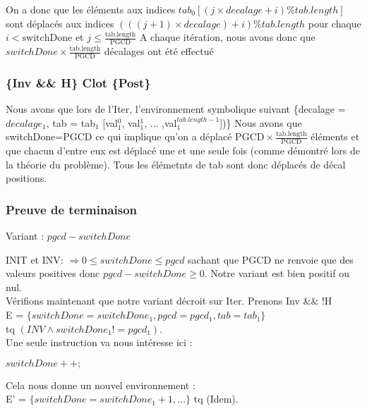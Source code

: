 On a donc que les éléments aux indices $tab_{0}[(j \times decalage + i) \% tab.length]$ sont déplacés aux indices $(((j+1)\times decalage)+i) \% tab.length$ pour chaque $i < \mathrm{switchDone}$ et $j \leq \frac{\mathrm{tab.length}}{\mathrm{PGCD}}$ 
A chaque itération, nous avons donc que $switchDone \times \frac {\mathrm{tab.length}}{\mathrm{PGCD}}$ décalages ont été effectué
\subsubsection*{\{Inv \&\& H\} Clot \{Post\}}
Nous avons que lors de l'Iter, l'environnement symbolique suivant \{decalage = $decalage_{1}$, tab = tab$_{1}$ [val$_{1}^{0}$, val$_{1}^{1}$, ... ,val$_{1}^{tab.length-1}$])\}
 Nous avons que switchDone=PGCD ce qui implique qu'on a déplacé
$\mathrm{PGCD}\times \frac{\mathrm{tab.length}}{\mathrm{PGCD}}$ éléments et
que chacun d'entre eux est déplacé une et une seule fois (comme démontré lors de la théorie du problème). Tous les élémetnts de tab sont donc déplacés de décal positions.

\subsubsection*{Preuve de terminaison}

Variant  : $pgcd - switchDone$

INIT et INV:  $\Rightarrow 0 \leq switchDone \leq pgcd$ sachant que PGCD ne renvoie que des valeurs positives donc $pgcd - switchDone \geq 0$. Notre variant est bien positif ou nul.\\ 

Vérifions maintenant que notre variant décroit sur Iter. Prenons Inv $\&\&$ !H \\

E = $\{ switchDone = switchDone_{1}, pgcd = pgcd_{1}, tab = tab_{1}\}$\\
tq $(INV \wedge switchDone_{1} != pgcd_{1})$.\\

Une seule instruction va nous intéresse ici : \\

\begin{center}
  $switchDone++;$\\
 \end{center} 
 
Cela nous donne un nouvel environnement :\\

E' = $\{switchDone = switchDone_{1}+1, ...\}$ tq (Idem).\\

